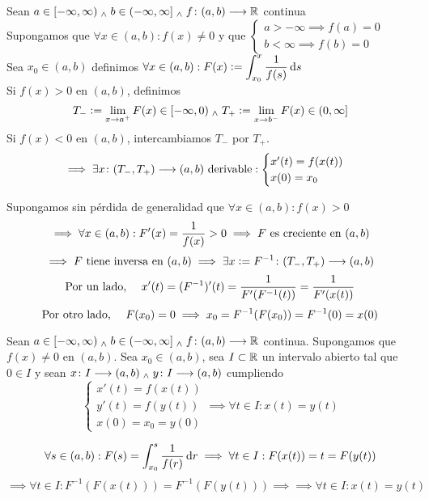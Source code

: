 
\begin{teo}
    Sean $a\in [-\infty, \infty) \; _{\wedge} \; b\in (-\infty, \infty] \; _{\wedge} \; f \colon (a,b) \longrightarrow \mathbb{R}$ continua \\
    Supongamos que $\forall x \in (a,b) : f(x) \ne 0$ y que $\begin{cases}
        a>-\infty \implies f(a)=0 \\
        b<\infty \implies f(b)=0
    \end{cases}$ \\
    Sea $x_0 \in (a,b)$ definimos $\ds \forall x \in (a,b) : F(x)\defeq\int_{x_0}^{x} \frac{1}{f(s)} \odif{s}$ \\
    Si $f(x)>0$ en $(a,b)$, definimos 
    $$\displaystyle T_-\vcentcolon= \lim_{x\to a^+}F(x)\in [-\infty, 0) \; _{\wedge} \; T_+\vcentcolon= \lim_{x\to b^-}F(x) \in (0, \infty]$$
    Si $f(x) < 0$ en $(a,b)$, intercambiamos $T_-$ por $T_+$.
    \[\implies \exists x \colon (T_-, T_+) \longrightarrow (a,b) \text{ derivable}: \begin{cases}
        x'(t)=f(x(t)) \\
        x(0)=x_0
    \end{cases}\]
    \begin{dem}
        Supongamos sin pérdida de generalidad que $\forall x \in (a,b) : f(x)>0$
        \[\implies \forall x \in (a,b) : F'(x)=\frac{1}{f(x)}>0 \implies F \text{ es creciente en }(a,b)\]
        \[\implies F \text{ tiene inversa en } (a, b) \implies \exists x\vcentcolon= F^{-1} \colon (T_-,T_+) \longrightarrow (a,b)\]
        \[\text{Por un lado, }\quad x'(t) = (F^{-1})'(t)=\frac{1}{F'(F^{-1}(t))}=\frac{1}{F'(x(t))}\]
        \[\text{Por otro lado, }\quad F(x_0)=0 \implies x_0= F^{-1}(F(x_0))=F^{-1}(0)=x(0)\]
    \end{dem}
\end{teo}

\begin{teo}
    Sean $a\in [-\infty, \infty) \; _{\wedge} \; b\in (-\infty, \infty] \; _{\wedge} \; f \colon (a,b) \longrightarrow \mathbb{R}$ continua. Supongamos que $f(x)\ne 0$ en $(a,b)$. Sea $x_0 \in (a,b)$, sea $I\subset \mathbb{R}$ un intervalo abierto tal que $0\in I$ y sean $x \colon I \longrightarrow (a,b) \; _{\wedge} \; y \colon I \longrightarrow (a,b)$ cumpliendo
    \[\begin{cases}
        x'(t)=f(x(t)) \\
        y'(t)=f(y(t)) \\
        x(0)=x_0=y(0)
    \end{cases} \implies \forall t \in I : x(t)=y(t)\]
    \begin{dem}
        \[\forall s \in (a,b) : F(s)=\int_{x_0}^{s} \frac{1}{f(r)}\odif{r} \implies \forall t \in I : F(x(t))=t=F(y(t))\]
        \[\implies \forall t \in I : F^{-1}(F(x(t)))=F^{-1}(F(y(t))) \implies \implies \forall t \in I : x(t)=y(t)\]
    \end{dem}
\end{teo}


